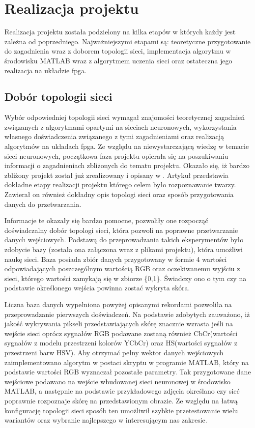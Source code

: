 \chapter{Realizacja projektu}
\label{cha:realizacja}

Realizacja projektu została podzielony na kilka etapów w których każdy jest zależna od  poprzedniego. Najważniejszymi etapami są: teoretyczne przygotowanie do zagadnienia wraz z doborem topologii sieci, implementacja algorytmu w środowisku MATLAB wraz z algorytmem uczenia sieci oraz ostateczna jego realizacja na układzie fpga. 
\section{Dobór topologii sieci}

Wybór odpowiedniej topologii sieci wymagał znajomości teoretycznej zagadnień związanych z algorytmami opartymi na sieciach neuronowych, wykorzystania własnego doświadczenia związanego z tymi zagadnieniami oraz realizacją algorytmów na układach fpga. Ze względu na niewystarczającą wiedzę w temacie sieci neuronowych, początkowa faza projektu opierała się na poszukiwaniu informacji o zagadnieniach zbliżonych do tematu projektu. Okazało się, iż bardzo zbliżony projekt został już zrealizowany i opisany w \cite{fdciuss}. Artykuł przedstawia dokładne etapy realizacji projektu którego celem było rozpoznawanie twarzy. Zawierał on również dokładny opis topologi sieci oraz sposób przygotowania danych do przetwarzania. 

Informacje te okazały się bardzo pomocne, pozwoliły one rozpocząć doświadczalny dobór topologi sieci, która pozwoli na poprawne przetwarzanie danych wejściowych. 
Podstawą do przeprowadzania takich eksperymentów było zdobycie bazy (została ona załączona wraz z plikami projektu), która umożliwi naukę sieci. Baza posiada zbiór danych przygotowany w formie 4 wartości odpowiadających poszczególnym wartością RGB oraz oczekiwanemu wyjściu z sieci, którego wartości zamykają się w zbiorze \{0,1\}. Świadczy ono o tym czy na podstawie określonego wejścia powinna zostać wykryta skóra.

Liczna baza danych wypełniona powyżej opisanymi rekordami pozwoliła na przeprowadzanie pierwszych doświadczeń. Na podstawie zdobytych zauważono, iż jakość wykrywania pikseli przedstawiających skórę znacznie wzrasta jeśli na wejście sieci oprócz sygnałów RGB podawane zostaną również CbCr(wartości sygnałów z modelu przestrzeni kolorów YCbCr) oraz HS(wartości sygnałów z przestrzeni barw HSV). Aby otrzymać pełny wektor danych wejściowych zaimplementowano algorytm w postaci skryptu w programie MATLAB, który na podstawie wartości RGB wyznaczał pozostałe parametry. Tak przygotowane dane wejściowe podawano na wejście wbudowanej sieci neuronowej w środowisko MATLAB, a następnie na podstawie przykładowego zdjęcia określano czy sieć poprawnie rozpoznaje skórę na przedstawionym obrazie. Ze względu na łatwą konfigurację topologii sieci sposób ten umożliwił szybkie przetestowanie wielu wariantów oraz wybranie najlepszego w interesującym nas zakresie.

